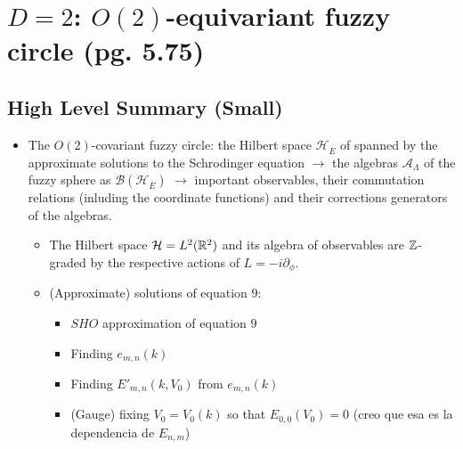\documentclass{article}
\newcommand{\cut}[1]{\overline{#1}}
\begin{document}
\section{$D=2$: $O(2)$-equivariant fuzzy circle (pg. 5.75)}

\subsection*{High Level Summary (Small)}

    \begin{itemize}

    \item The $O(2)$-covariant fuzzy circle: the Hilbert space $\mathcal H_{\cut E}$ of spanned by the approximate solutions to the Schrodinger equation $\longrightarrow$ the algebras $\mathcal A_\Lambda$ of the fuzzy sphere as $\mathcal B(\mathcal H_{\cut E})$ $\longrightarrow$ important observables, their commutation relations (inluding the coordinate functions) and their corrections generators of the algebras.
    
        \begin{itemize}
            
        \item The Hilbert space $\mathcal H = L^2(\mathbb{R}^2)$ and its algebra of observables are $\mathbb{Z}$-graded by the respective actions of $L = -i\partial_\phi$.
        
        \item (Approximate) solutions of equation $9$:
        
            \begin{itemize}
            
            \item $SHO$ approximation of equation $9$
            
            \item Finding $e_{m, n}(k)$
            
            \item Finding $E'_{m,n}(k, V_0)$ from $e_{m,n}(k)$
            
            \item (Gauge) fixing $V_0 = V_0(k)$ so that $E_{0, 0}(V_0) = 0$ (creo que esa es la dependencia de $E_{n,m}$)
            

\end{itemize}
\end{itemize}
\end{itemize}
\end{document}

